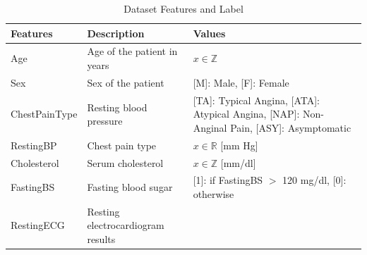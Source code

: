 \documentclass[12pt,conference]{IEEEtran}
\begin{document}
\begin{table}[t]
\centering
\caption{\label{tab:features}Dataset Features and Label\cite{kaggle} }
\begin{tabular}{||>{\centering}m{}>{\centering\arraybackslash}m{}>{\centering\arraybackslash}m{}||}
\hline
 Features & Description & Values\\ [0.5ex] 
\hline\hline
\vspace{.1cm}Age\vspace{.1cm} & Age of the patient in years 
                        & \vspace{.1cm}$x\in \mathbb{Z}$\vspace{.1cm}\\
\hline
\vspace{.1cm}Sex \vspace{.1cm} & Sex of the patient
                &\vspace{.1cm}[M]: Male, [F]: Female\vspace{.1cm}\\
\hline
\vspace{.1cm}ChestPainType \vspace{.1cm} & Resting blood pressure
                &\vspace{.1cm}[TA]: Typical Angina, [ATA]: Atypical Angina, [NAP]: Non-Anginal Pain, [ASY]: Asymptomatic\vspace{.1cm}\\
\hline
\vspace{.1cm}RestingBP \vspace{.1cm} & Chest pain type
                &\vspace{.1cm}$x\in \mathbb{R}$ [mm Hg]\vspace{.1cm}\\
\hline
\vspace{.1cm}Cholesterol \vspace{.1cm} & Serum cholesterol
                &\vspace{.1cm}$x\in \mathbb{Z}$ [mm/dl]\vspace{.1cm}\\
\hline
\vspace{.1cm}FastingBS \vspace{.1cm} & Fasting blood sugar
                &\vspace{.1cm}[1]: if FastingBS $>$ 120 mg/dl, [0]: otherwise\vspace{.1cm}\\
\hline
\vspace{.1cm}RestingECG \vspace{.1cm} & Resting electrocardiogram results

\end{tabular}
\end{table}
\end{document}

